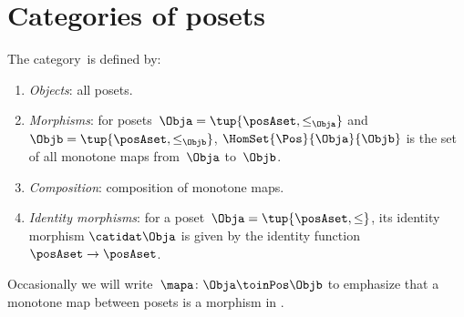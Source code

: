 
\section[Categories of posets]{Categories of posets}
\label{sec:category-Pos}


\begin{ctdefinition}
    \label{def:Pos}
    The category~\Pos is defined by:
    \begin{enumerate}
        \item \emph{Objects}: all posets.
        \item \emph{Morphisms}: for posets~$\Obja = \tup{\posAset, \leq_\Obja}$ and $\Objb = \tup{\posAset, \leq_\Objb}$,  $\HomSet{\Pos}{\Obja}{\Objb}$ is the set of all monotone maps from~$\Obja$ to~$\Objb$.
        \item \emph{Composition}: composition of monotone maps.
         \item \emph{Identity morphisms}: for a poset~$\Obja = \tup{\posAset, \leq}$, its identity morphism $\catidat\Obja$ is given by the identity function $\posAset \to \posAset$. 
    \end{enumerate}
\end{ctdefinition}

Occasionally we will write~$\mapa \colon \Obja \toinPos \Objb$ to emphasize that a monotone map between posets is a morphism in \Pos.
